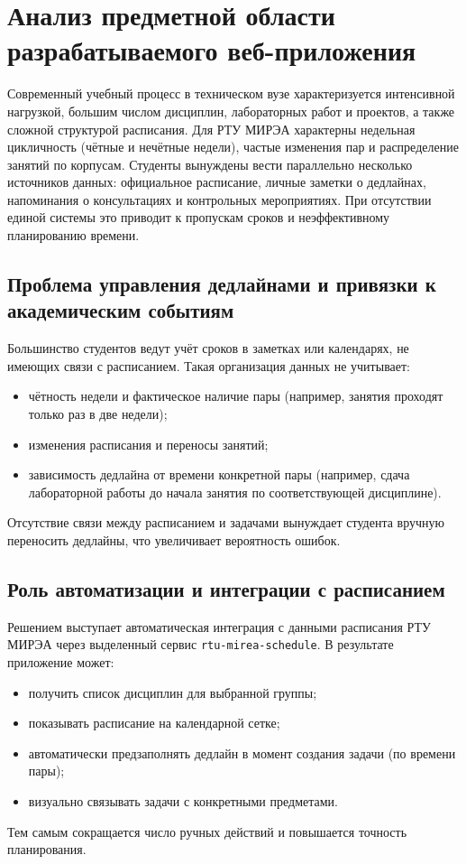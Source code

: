 \section{Анализ предметной области разрабатываемого веб-приложения}

Современный учебный процесс в техническом вузе характеризуется интенсивной нагрузкой, большим числом дисциплин, лабораторных работ и проектов, а также сложной структурой расписания. Для РТУ МИРЭА характерны недельная цикличность (чётные и нечётные недели), частые изменения пар и распределение занятий по корпусам. Студенты вынуждены вести параллельно несколько источников данных: официальное расписание, личные заметки о дедлайнах, напоминания о консультациях и контрольных мероприятиях. При отсутствии единой системы это приводит к пропускам сроков и неэффективному планированию времени.

\subsection{Проблема управления дедлайнами и привязки к академическим событиям}

Большинство студентов ведут учёт сроков в заметках или календарях, не имеющих связи с расписанием. Такая организация данных не учитывает:
\begin{itemize}
    \item чётность недели и фактическое наличие пары (например, занятия проходят только раз в две недели);
    \item изменения расписания и переносы занятий;
    \item зависимость дедлайна от времени конкретной пары (например, сдача лабораторной работы до начала занятия по соответствующей дисциплине).
\end{itemize}
Отсутствие связи между расписанием и задачами вынуждает студента вручную переносить дедлайны, что увеличивает вероятность ошибок.

\subsection{Роль автоматизации и интеграции с расписанием}

Решением выступает автоматическая интеграция с данными расписания РТУ МИРЭА через выделенный сервис \texttt{rtu-mirea-schedule}. В результате приложение может:
\begin{itemize}
    \item получить список дисциплин для выбранной группы;
    \item показывать расписание на календарной сетке;
    \item автоматически предзаполнять дедлайн в момент создания задачи (по времени пары);
    \item визуально связывать задачи с конкретными предметами.
\end{itemize}
Тем самым сокращается число ручных действий и повышается точность планирования.

